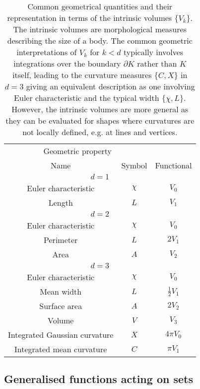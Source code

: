 \begin{SCtable}
  \begin{minipage}[b]{\linewidth}
    \centering
    \begin{tabular}{ccc}
      \toprule
      \multicolumn{2}{c}{Geometric property} \\
      \cmidrule(r){1-2}
      Name & Symbol & Functional \\
      \midrule
      \multicolumn{3}{c}{$d = 1$} \\
      \midrule
      Euler characteristic & $\chi$ & $V_0$ \\
      Length & $L$ & $V_1$ \\
      \midrule
      \multicolumn{3}{c}{$d = 2$} \\
      \midrule
      Euler characteristic & $\chi$ & $V_0$ \\
      Perimeter & $L$ & $2 V_1$ \\
      Area & $A$ & $V_2$ \\
      \midrule
      \multicolumn{3}{c}{$d = 3$} \\
      \midrule
      Euler characteristic & $\chi$ & $V_0$ \\
      Mean width & $L$ & $\frac{1}{2} V_1$ \\
      Surface area & $A$ & $2 V_2$ \\
      Volume & $V$ & $V_3$ \\
      Integrated Gaussian curvature & $X$ & $4 \pi V_0$ \\
      Integrated mean curvature & $C$ & $\pi V_1$ \\
      \bottomrule
    \end{tabular}
  \end{minipage}
  \caption[Common geometrical quantities]{
    Common geometrical quantities and their representation in terms of the intrinsic volumes $\{V_k\}$.
    The intrinsic volumes are morphological measures describing the size of a body.
    The common geometric interpretations of $V_k$ for $k < d$ typically involves integrations over the boundary $\partial K$ rather than $K$ itself, leading to the curvature measures $\{C,X\}$ in $d=3$ giving an equivalent description as one involving Euler characteristic and the typical width $\{\chi, L\}$.
    However, the intrinsic volumes are more general as they can be evaluated for shapes where curvatures are not locally defined, e.g. at lines and vertices.}
  \label{table:geometric-quantities}
\end{SCtable}

\subsection{Generalised functions acting on sets}

